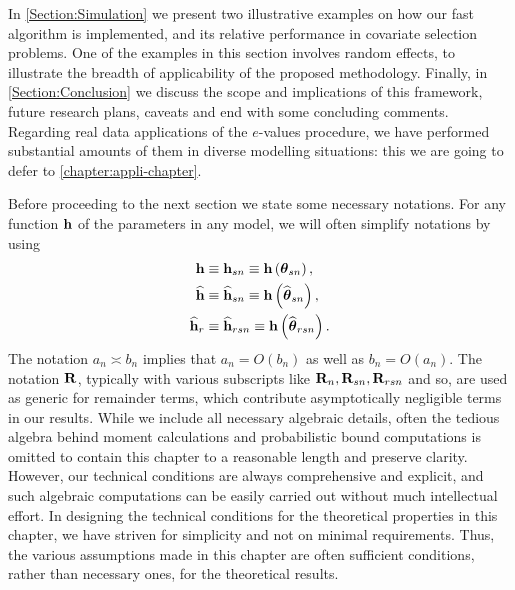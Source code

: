 In \ref{Section:Simulation} we present two illustrative examples on how our fast algorithm is implemented, and its relative performance in covariate selection problems. One of the examples in this section involves random effects, to illustrate the breadth of applicability of the proposed methodology. Finally, in \ref{Section:Conclusion} we discuss the scope and implications of this framework, future research plans, caveats and end with some concluding comments. Regarding real data applications of the $e$-values procedure, we have performed substantial amounts of them in diverse modelling situations: this we are going to defer to \ref{chapter:appli-chapter}.

Before proceeding to the next section we state some necessary notations. For any function ${\bf{h}}$ of the parameters in any model, we will often simplify notations by using 
%
\begin{align*}
{\bf{h}} & \equiv {\bf{h}}_{ s n}  \equiv {\bf{h}} \left( {{\boldsymbol{\theta}}}_{ s n} \right), \\
\widehat{{\bf{h}}} & \equiv \widehat{{\bf{h}}}_{ s n} \equiv {\bf{h}} \left( \widehat{{\boldsymbol{\theta}}}_{ s n}  \right), \\
\widehat{{\bf{h}}}_{r} & \equiv \widehat{{\bf{h}}}_{r s n} \equiv {\bf{h}} \left( \widehat{{\boldsymbol{\theta}}}_{r s n}  \right).
\end{align*}
The  notation $a_{n} \asymp b_{n}$ implies that $a_{n} = O (b_{n})$ as well as $b_{n} = O (a_{n})$. The notation ${\mathbf{R}}$, typically with various subscripts like ${\mathbf{R}}_{n}, {\mathbf{R}}_{ s n}, {\mathbf{R}}_{ r s n}$ and so, are used as generic for remainder terms, which contribute asymptotically negligible terms in our results. While we include all necessary algebraic details, often the tedious algebra behind moment calculations and probabilistic bound computations is omitted to contain this chapter to a reasonable length and preserve clarity. However, our technical conditions are always comprehensive and explicit, and such algebraic computations can be easily carried out without much intellectual effort. In designing the technical conditions for the theoretical properties in this chapter, we have striven for simplicity and not on minimal requirements. Thus, the various assumptions made in this chapter are often sufficient conditions, rather than necessary ones, for the theoretical results.
